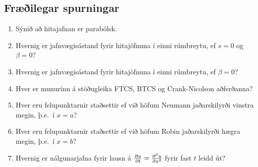 \documentclass[icelandic,a4paper,12pt]{article}
\begin{document}
  

\subsection{Fræðilegar spurningar}
\begin{enumerate}
\item Sýnið að hitajafnan er parabólsk.
\item Hvernig er jafnvægisástand fyrir hitajöfnuna í einni rúmbreytu, ef
$s=0$ og $\beta=0$?
\item Hvernig er jafnvægisástand fyrir hitajöfnuna í einni rúmbreytu, ef
$\beta=0$?
\item Hver er munurinn á stöðugleika FTCS, BTCS og Crank-Nicolson aðferðanna?
\item Hver eru felupunktarnir staðsettir ef við höfum Neumann jaðarskilyrði
 vinstra megin, þ.e.~í $x=a$?
\item Hver eru felupunktarnir staðsettir ef við höfum Robin jaðarskilyrði
hægra megin, þ.e.~í $x=b$?
\item Hvernig er  nálgunarjafna fyrir lausn á $\frac{{\partial} u}{{\partial} t}=\frac{{\partial}^2 u}{{\partial} x^2}$
fyrir fast $t$ leidd út? 

\end{enumerate}
\end{document}
